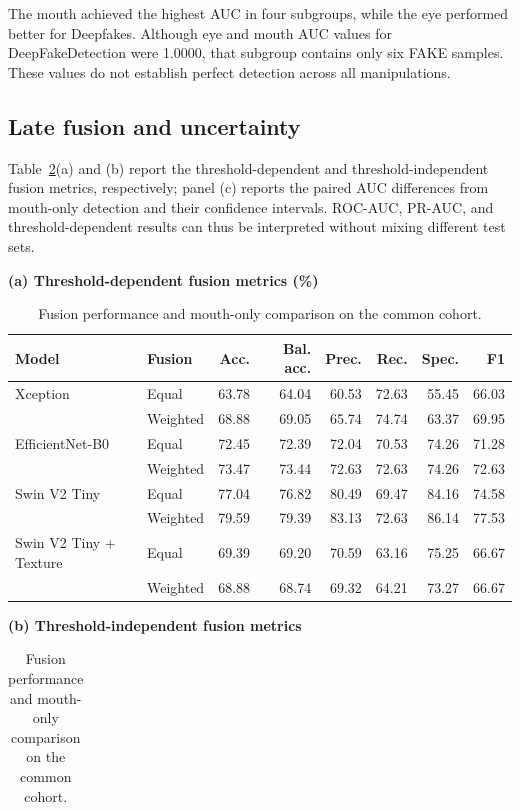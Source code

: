 \documentclass[a4paper]{elektr}
\begin{document}
The mouth achieved the highest AUC in four subgroups, while the eye performed better for Deepfakes. Although eye and mouth AUC values for DeepFakeDetection were 1.0000, that subgroup contains only six FAKE samples. These values do not establish perfect detection across all manipulations.

\subsection{Late fusion and uncertainty}
Table~\ref{tab:fusion}(a) and (b) report the threshold-dependent and threshold-independent fusion metrics, respectively; panel (c) reports the paired AUC differences from mouth-only detection and their confidence intervals. ROC-AUC, PR-AUC, and threshold-dependent results can thus be interpreted without mixing different test sets.
\begin{table}[!htbp]\centering\begin{minipage}{15.8cm}
\caption{Fusion performance and mouth-only comparison on the common cohort.}\label{tab:fusion}
\centering\small
\textbf{(a) Threshold-dependent fusion metrics (\%)}\par\smallskip
\begin{tabular*}{\linewidth}{@{\extracolsep{\fill}}llrrrrrr@{}}\toprule
Model & Fusion & Acc. & Bal. acc. & Prec. & Rec. & Spec. & F1 \\\midrule
Xception & Equal & 63.78 & 64.04 & 60.53 & 72.63 & 55.45 & 66.03 \\
 & Weighted & 68.88 & 69.05 & 65.74 & 74.74 & 63.37 & 69.95 \\
EfficientNet-B0 & Equal & 72.45 & 72.39 & 72.04 & 70.53 & 74.26 & 71.28 \\
 & Weighted & 73.47 & 73.44 & 72.63 & 72.63 & 74.26 & 72.63 \\
Swin V2 Tiny & Equal & 77.04 & 76.82 & 80.49 & 69.47 & 84.16 & 74.58 \\
 & Weighted & 79.59 & 79.39 & 83.13 & 72.63 & 86.14 & 77.53 \\
Swin V2 Tiny + Texture & Equal & 69.39 & 69.20 & 70.59 & 63.16 & 75.25 & 66.67 \\
 & Weighted & 68.88 & 68.74 & 69.32 & 64.21 & 73.27 & 66.67 \\
\bottomrule\end{tabular*}
\par\medskip
\textbf{(b) Threshold-independent fusion metrics}\par\smallskip
\begin{tabular*}{\linewidth}{@{\extracolsep{\fill}}llrr@{}}\toprule

\end{tabular*}
\end{minipage}
\end{table}
\end{document}
